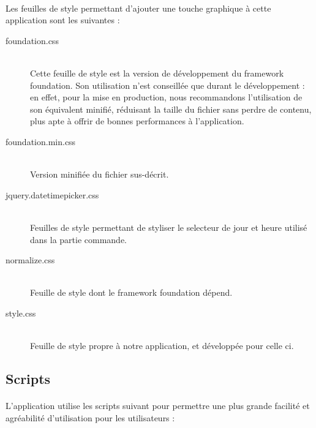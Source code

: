         \paragraph{}
            Les feuilles de style permettant d'ajouter une touche graphique à
            cette application sont les suivantes :
        \begin{description}
            \item[foundation.css]\hfill \\
                Cette feuille de style est la version de développement du
                framework foundation.
                Son utilisation n'est conseillée que durant le développement : 
                en effet, pour la mise en production, nous recommandons
                l'utilisation de son équivalent minifié, réduisant la taille du
                fichier sans perdre de contenu, plus apte à offrir de bonnes
                performances à l'application.
            \item[foundation.min.css]\hfill \\
                Version minifiée du fichier sus-décrit.
            \item[jquery.datetimepicker.css]\hfill \\
                Feuilles de style permettant de styliser le selecteur de
                jour et heure utilisé dans la partie commande.
            \item[normalize.css]\hfill \\
                Feuille de style dont le framework foundation dépend.
            \item[style.css]\hfill \\
                Feuille de style propre à notre application, et développée
                pour celle ci.
        \end{description}
    \subsection{Scripts}
        \paragraph{}
            L'application utilise les scripts suivant pour permettre une plus
            grande facilité et agréabilité d'utilisation pour les
            utilisateurs :
        \begin{description}
        \end{description}
